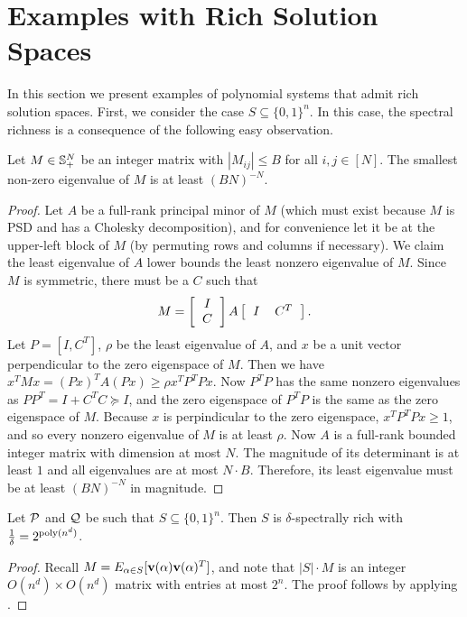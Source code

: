 \section{Examples with Rich Solution Spaces}
\label{sec:nicespaces}
In this section we present examples of polynomial systems that admit rich solution spaces. First, we consider the case $S \subseteq \{0,1\}^n$. In this case, the spectral richness is a consequence of the following easy observation.
\begin{lemma} \label{lem:integer}
	Let $M \in \mathbb{S}_+^{N}$ be an integer matrix with $|M_{ij}| \leq B$ for all $i,j \in [N]$.  The smallest non-zero eigenvalue of $M$ is at least 
	$(BN)^{-N}$.
\end{lemma}
\begin{proof}
Let $A$ be a full-rank principal minor of $M$ (which must exist because $M$ is PSD and has a Cholesky decomposition), and for convenience let it be at the upper-left block of $M$ (by permuting rows and columns if necessary). We claim the least eigenvalue of $A$ lower bounds the least nonzero eigenvalue of $M$.
%
Since $M$ is symmetric, there must be a $C$ such that
\[M = \left[\begin{tabular}{c} $I$ \\ $C$\end{tabular}\right]A\left[\begin{tabular}{cc} $I$ & $C^T$\end{tabular}\right].\]
Let $P = [I, C^T]$, $\rho$ be the least eigenvalue of $A$, and $x$ be a unit vector perpendicular to the zero eigenspace of $M$. Then we have $x^TMx = (Px)^TA(Px) \geq \rho x^TP^TPx$.
Now $P^TP$ has the same nonzero eigenvalues as $PP^T = I + C^TC \succeq I$, and the zero eigenspace of $P^TP$ is the same as the zero eigenspace of $M$. Because $x$ is perpindicular to the zero eigenspace, $x^TP^TPx \geq 1$, and so every nonzero eigenvalue of $M$ is at least $\rho$. Now $A$ is a full-rank bounded integer matrix with dimension at most $N$. The magnitude of its determinant is at least $1$ and all eigenvalues are at most $N \cdot B$.  Therefore, its least eigenvalue must be at least $(BN)^{-N}$ in magnitude. 
\end{proof}


\begin{lemma}\label{lem:integer-rich}
Let $\mathcal P$ and $\mathcal Q$ be such that $S \subseteq \{0,1\}^n$. Then $S$ is $\delta$-spectrally rich with $\frac{1}{\delta} = 2^{\operatorname{poly}(n^d)}$.
\end{lemma}
\begin{proof}
	Recall $M = E_{\alpha \in S}[{\bf v}(\alpha){\bf v}(\alpha)^T]$, and note that $|S| \cdot M$ is an integer $O(n^d) \times O(n^d)$ matrix with entries at most $2^n$.  The proof follows by applying . 
\end{proof}

